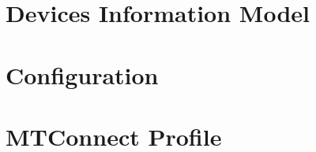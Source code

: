 \section{Devices Information Model}








\section{Configuration}






\section{MTConnect Profile}

